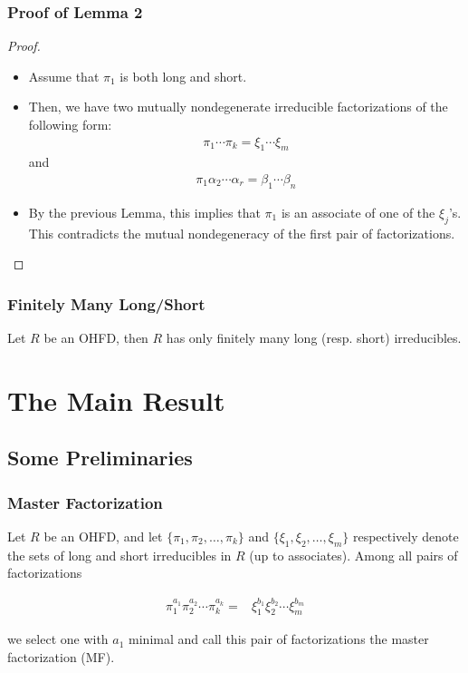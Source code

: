 \begin{frame}
  \frametitle{Proof of Lemma 2}
  \begin{proof}
    \begin{itemize}
      \item <1->Assume that $\pi_1$ is both long and short.
      \item <2->Then, we have two mutually nondegenerate irreducible factorizations of the following form:
	\begin{align*}
	  \pi_1\cdots\pi_k=\xi_1\cdots\xi_m
	\end{align*}
	and
	\begin{align*}
	  \pi_1\alpha_2\cdots\alpha_r=\beta_1\cdots\beta_n
	\end{align*}
      \item <3->By the previous Lemma, this implies that $\pi_1$ is an associate of one of the $\xi_j$'s.
	This contradicts the mutual nondegeneracy of the first pair of factorizations.
    \end{itemize}
  \end{proof}
\end{frame}

\begin{frame}
  \frametitle{Finitely Many Long/Short}
  \begin{fact}
    Let $R$ be an OHFD, then $R$ has only finitely many long (resp. short) irreducibles.
  \end{fact}
\end{frame}

\section{The Main Result}

\subsection{Some Preliminaries }

\begin{frame}
  \frametitle{Master Factorization }
  \begin{definition}
    Let $R$ be an OHFD, and let $\{\pi_{1},\pi_{2},\ldots,\pi_{k}\}$ and $\{\xi_{1},\xi_{2},\ldots,\xi_{m}\}$ respectively denote the sets of long and short irreducibles in $R$ (up to associates).
    Among all pairs of factorizations

    \begin{align*}
      \pi_{1}^{a_{1}}\pi_{2}^{a_{2}}\cdots\pi_{k}^{a_{k}}= & \xi_{1}^{b_{1}}\xi_{2}^{b_{2}}\cdots\xi_{m}^{b_{m}}
    \end{align*}

    we select one with $a_{1}$ minimal and call this pair of factorizations the \alert{master factorization (MF)}.
  \end{definition}
\end{frame}

